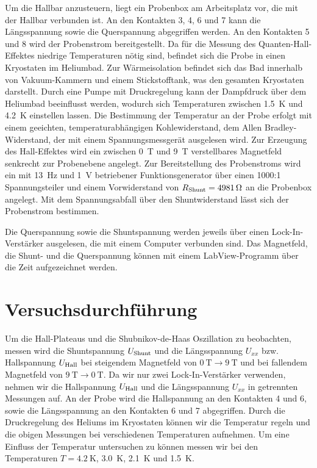 \documentclass[paper=a4,fontsize=10pt,DIV=18,twocolumn,parskip=half]{scrartcl}
\numberwithin{equation}{section}    %
\begin{document}
Um die Hallbar anzusteuern, liegt ein Probenbox am Arbeitsplatz vor, die mit der Hallbar verbunden ist. An den Kontakten 3, 4, 6 und 7 kann die Längsspannung sowie die Querspannung abgegriffen werden. An den Kontakten 5 und 8 wird der Probenstrom bereitgestellt.
Da für die Messung des Quanten-Hall-Effektes niedrige Temperaturen nötig sind, befindet sich die Probe in einen Kryostaten im Heliumbad. Zur Wärmeisolation befindet sich das Bad innerhalb von Vakuum-Kammern und einem Stickstofftank, was den gesamten Kryostaten darstellt. Durch eine Pumpe mit Druckregelung kann der Dampfdruck über dem Heliumbad beeinflusst werden, wodurch sich Temperaturen zwischen \SI{1.5}{\kelvin} und \SI{4.2}{\kelvin} einstellen lassen. Die Bestimmung der Temperatur an der Probe erfolgt mit einem geeichten, temperaturabhängigen Kohlewiderstand, dem Allen Bradley-Widerstand, der mit einem Spannungsmessgerät ausgelesen wird. Zur Erzeugung des Hall-Effektes wird ein zwischen \SI{0}{\tesla} und \SI{9}{\tesla} verstellbares Magnetfeld senkrecht zur Probenebene angelegt. 
Zur Bereitstellung des Probenstroms wird ein mit \SI{13}{\hertz} und \SI{1}{\volt} betriebener Funktionsgenerator über einen 1000:1 Spannungsteiler und einem Vorwiderstand von $R_{\rm Shunt} = \SI{4981}{\ohm}$ an die Probenbox angelegt. Mit dem Spannungsabfall über den Shuntwiderstand lässt sich der Probenstrom bestimmen.

Die Querspannung sowie die Shuntspannung werden jeweils über einen Lock-In-Verstärker ausgelesen, die mit einem Computer verbunden sind.
Das Magnetfeld, die Shunt- und die Querspannung können mit einem LabView-Programm über die Zeit aufgezeichnet werden.

\section{Versuchsdurchführung}
\label{versuch}
%
Um die Hall-Plateaus und die Shubnikov-de-Haas Oszillation zu beobachten, messen wird die Shuntspannung $U_{\rm Shunt}$ und die Längsspannung $U_{xx}$ bzw. Hallspannung $U_{\rm Hall}$ bei steigendem Magnetfeld von $\SI{0}{\tesla} \rightarrow \SI{9}{\tesla}$ und bei fallendem Magnetfeld von $\SI{9}{\tesla} \rightarrow \SI{0}{\tesla}$. Da wir nur zwei Lock-In-Verstärker verwenden, nehmen wir die Hallspannung $U_{\rm Hall}$ und die Längsspannung $U_{xx}$ in getrennten Messungen auf. An der Probe wird die Hallspannung an den Kontakten 4 und 6, sowie die Längsspannung an den Kontakten 6 und 7 abgegriffen. Durch die Druckregelung des Heliums im Kryostaten können wir die Temperatur regeln und die obigen Messungen bei verschiedenen Temperaturen aufnehmen.
Um eine Einfluss der Temperatur untersuchen zu können messen wir bei den Temperaturen $T=\SI{4.2}{\kelvin}$, \SI{3.0}{\kelvin}, \SI{2.1}{\kelvin} und \SI{1.5}{\kelvin}.
\end{document}
